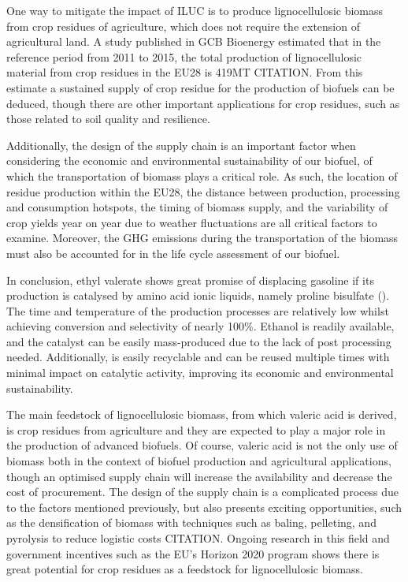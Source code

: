 \documentclass[11pt]{article}
\begin{document}
One way to mitigate the impact of ILUC is to produce lignocellulosic biomass from crop residues of agriculture, which does not require the extension of agricultural land. A study published in GCB Bioenergy estimated that in the reference period from 2011 to 2015, the total production of lignocellulosic material from crop residues in the EU28 is 419MT CITATION. From this estimate a sustained supply of crop residue for the production of biofuels can be deduced, though there are other important applications for crop residues, such as those related to soil quality and resilience.  

Additionally, the design of the supply chain is an important factor when considering the economic and environmental sustainability of our biofuel, of which the transportation of biomass plays a critical role. As such, the location of residue production within the EU28, the distance between production, processing and consumption hotspots, the timing of biomass supply, and the variability of crop yields year on year due to weather fluctuations are all critical factors to examine. Moreover, the GHG emissions during the transportation of the biomass must also be accounted for in the life cycle assessment of our biofuel.

In conclusion, ethyl valerate shows great promise of displacing gasoline if its production is catalysed by amino acid ionic liquids, namely proline bisulfate (). The time and temperature of the production processes are relatively low whilst achieving conversion and selectivity of nearly 100\%. Ethanol is readily available, and the catalyst can be easily mass-produced due to the lack of post processing needed. Additionally,  is easily recyclable and can be reused multiple times with minimal impact on catalytic activity, improving its economic and environmental sustainability.

The main feedstock of lignocellulosic biomass, from which valeric acid is derived, is crop residues from agriculture and they are expected to play a major role in the production of advanced biofuels. Of course, valeric acid is not the only use of biomass both in the context of biofuel production and agricultural applications, though an optimised supply chain will increase the availability and decrease the cost of procurement. The design of the supply chain is a complicated process due to the factors mentioned previously, but also presents exciting opportunities, such as the densification of biomass with techniques such as baling, pelleting, and pyrolysis to reduce logistic costs CITATION. Ongoing research in this field and government incentives such as the EU’s Horizon 2020 program shows there is great potential for crop residues as a feedstock for lignocellulosic biomass.
\end{document}
